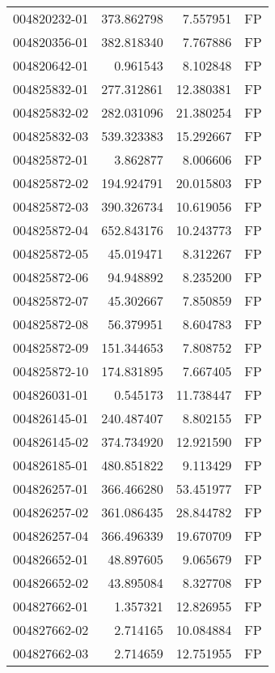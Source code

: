 \begin{tabular}{lrrl}
004820232-01 &  373.862798 &       7.557951 &   FP \\
004820356-01 &  382.818340 &       7.767886 &   FP \\
004820642-01 &    0.961543 &       8.102848 &   FP \\
004825832-01 &  277.312861 &      12.380381 &   FP \\
004825832-02 &  282.031096 &      21.380254 &   FP \\
004825832-03 &  539.323383 &      15.292667 &   FP \\
004825872-01 &    3.862877 &       8.006606 &   FP \\
004825872-02 &  194.924791 &      20.015803 &   FP \\
004825872-03 &  390.326734 &      10.619056 &   FP \\
004825872-04 &  652.843176 &      10.243773 &   FP \\
004825872-05 &   45.019471 &       8.312267 &   FP \\
004825872-06 &   94.948892 &       8.235200 &   FP \\
004825872-07 &   45.302667 &       7.850859 &   FP \\
004825872-08 &   56.379951 &       8.604783 &   FP \\
004825872-09 &  151.344653 &       7.808752 &   FP \\
004825872-10 &  174.831895 &       7.667405 &   FP \\
004826031-01 &    0.545173 &      11.738447 &   FP \\
004826145-01 &  240.487407 &       8.802155 &   FP \\
004826145-02 &  374.734920 &      12.921590 &   FP \\
004826185-01 &  480.851822 &       9.113429 &   FP \\
004826257-01 &  366.466280 &      53.451977 &   FP \\
004826257-02 &  361.086435 &      28.844782 &   FP \\
004826257-04 &  366.496339 &      19.670709 &   FP \\
004826652-01 &   48.897605 &       9.065679 &   FP \\
004826652-02 &   43.895084 &       8.327708 &   FP \\
004827662-01 &    1.357321 &      12.826955 &   FP \\
004827662-02 &    2.714165 &      10.084884 &   FP \\
004827662-03 &    2.714659 &      12.751955 &   FP \\

\end{tabular}
